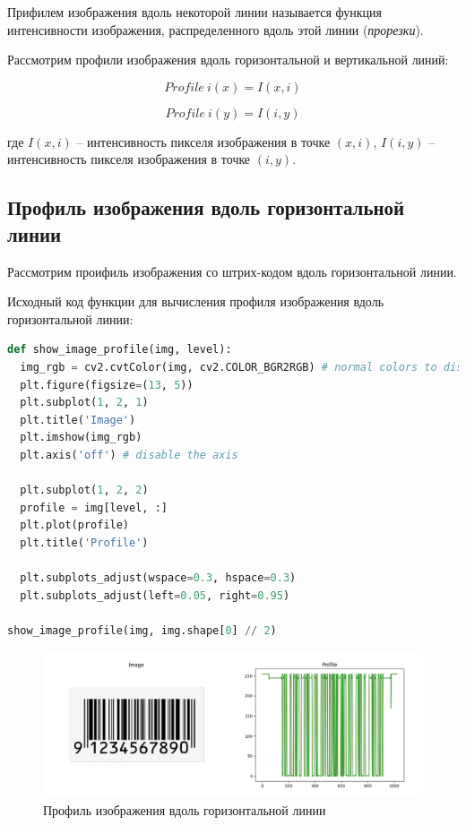 \documentclass[a4paper, 12pt]{extarticle}
\begin{document}
Прифилем изображения вдоль некоторой линии называется функция интенсивности изображения, распределенного вдоль этой линии (\textit{прорезки}).

Рассмотрим профили изображения вдоль горизонтальной и вертикальной линий: 

\begin{equation}
  Profile~i(x) = I(x, i)
\end{equation}
  
\begin{equation}
  Profile~i(y) = I(i, y)
\end{equation}

где $I(x, i)$ -- интенсивность пикселя изображения в точке $(x, i)$, $I(i, y)$ -- интенсивность пикселя изображения в точке $(i, y)$.

\subsection{Профиль изображения вдоль горизонтальной линии}

Рассмотрим проифиль изображения со штрих-кодом вдоль горизонтальной линии.

Исходный код функции для вычисления профиля изображения вдоль горизонтальной линии:

\begin{lstlisting}[language=Python]
def show_image_profile(img, level):
  img_rgb = cv2.cvtColor(img, cv2.COLOR_BGR2RGB) # normal colors to display
  plt.figure(figsize=(13, 5))
  plt.subplot(1, 2, 1)
  plt.title('Image')
  plt.imshow(img_rgb)
  plt.axis('off') # disable the axis

  plt.subplot(1, 2, 2)
  profile = img[level, :]
  plt.plot(profile)
  plt.title('Profile')

  plt.subplots_adjust(wspace=0.3, hspace=0.3)
  plt.subplots_adjust(left=0.05, right=0.95)

show_image_profile(img, img.shape[0] // 2)
\end{lstlisting}

\begin{figure}[h]
    \centering
    \includegraphics[width=\textwidth]{../results/Profile.png}
    \caption{Профиль изображения вдоль горизонтальной линии}
    \label{fig:profile}
\end{figure}
\end{document}
